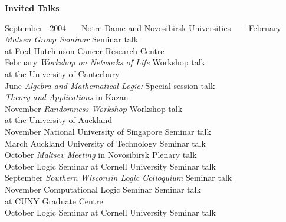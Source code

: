 \documentclass[12pt]{article}
\begin{document}
\centerline{\bf Invited Talks}
\begin{tabbing}
September \ \=2004 \ \ \ \= Notre Dame and Novosibirsk Universities \ \ \ \= \kill
February              \>  {\em Matsen Group Seminar }                                     \> Seminar talk \\
            \>              \>  at Fred Hutchinson Cancer Research Centre                                    \> \\
February              \>  {\em Workshop on Networks of Life }                                     \> Workshop talk \\
            \>              \>  at the University of Canterbury                                      \> \\
June              \>  {\em Algebra and Mathematical Logic:}  \> Special session talk \\
            \>              \>  {\em Theory and Applications} in Kazan                                    \> \\
November              \>  {\em Randomness Workshop }                                             \> Workshop  talk\\
            \>              \>  at the University of Auckland                                     \> \\
November              \>  National University of Singapore                                          \> Seminar talk\\
March              \>  Auckland University of Technology                                          \> Seminar talk\\
October              \> {\em Maltsev Meeting} in Novosibirsk                                            \> Plenary talk\\
October               \>Logic Seminar at Cornell University                                      \> Seminar talk\\
September          \> {\em Southern Wisconsin Logic Colloquium}                                  \> Seminar talk\\
November          \> Computational Logic Seminar                                              \> Seminar talk\\
                   \>                 \> at CUNY Graduate Centre\\                                                    
October              \> Logic Seminar at Cornell University                                      \> Seminar talk\\

\end{tabbing}
\end{document}
